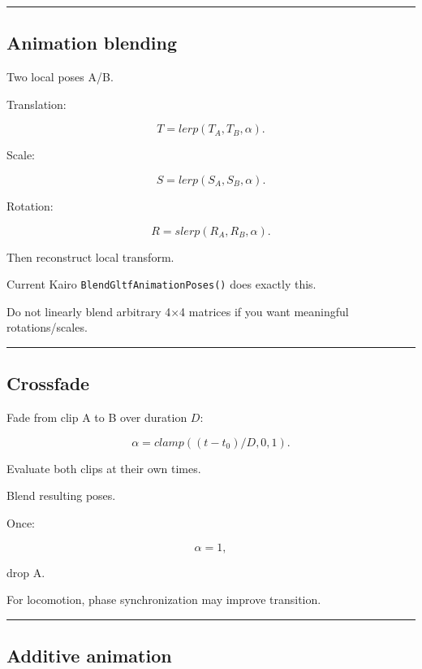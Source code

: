 \begin{center}\rule{0.5\linewidth}{0.5pt}\end{center}

\subsection{Animation blending}\label{04-visual-computing-ii-ch041-animation-blending}

Two local poses A/B.

Translation:

\[
T=
lerp(T_A,T_B,\alpha).
\]

Scale:

\[
S=
lerp(S_A,S_B,\alpha).
\]

Rotation:

\[
R=
slerp(R_A,R_B,\alpha).
\]

Then reconstruct local transform.

Current Kairo \texttt{BlendGltfAnimationPoses()} does exactly this.

Do not linearly blend arbitrary 4×4 matrices if you want meaningful rotations/scales.

\begin{center}\rule{0.5\linewidth}{0.5pt}\end{center}

\subsection{Crossfade}\label{04-visual-computing-ii-ch041-crossfade}

Fade from clip A to B over duration \(D\):

\[
\alpha=
clamp(
(t-t_0)/D,
0,1
).
\]

Evaluate both clips at their own times.

Blend resulting poses.

Once:

\[
\alpha=1,
\]

drop A.

For locomotion, phase synchronization may improve transition.

\begin{center}\rule{0.5\linewidth}{0.5pt}\end{center}

\subsection{Additive animation}\label{04-visual-computing-ii-ch041-additive-animation}

